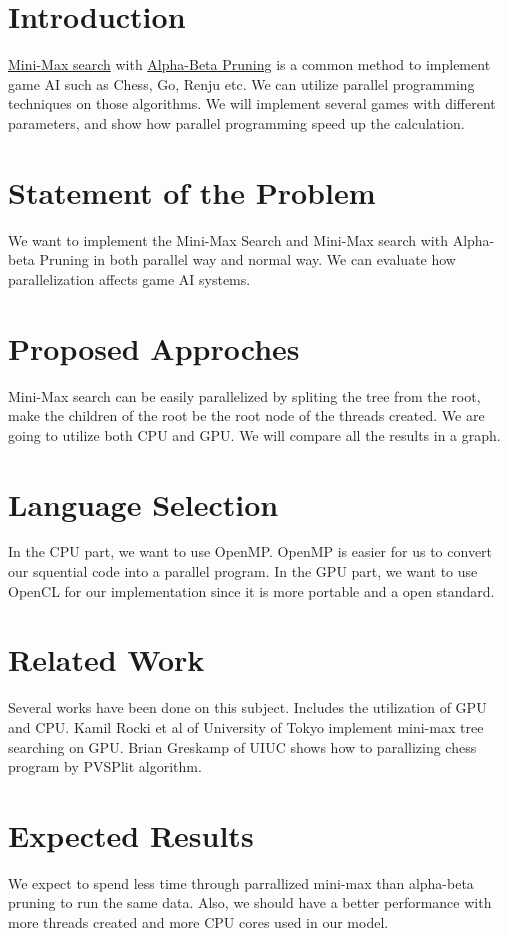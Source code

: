\documentclass{sig-alternate-05-2015}
\begin{document}
\section{Introduction}
\href{https://en.wikipedia.org/wiki/Minimax}{Mini-Max search} with \href{https://en.wikipedia.org/wiki/Minimax}{Alpha-Beta Pruning} is a common method to implement game AI such as Chess, Go, Renju etc. We can utilize parallel programming techniques on those algorithms. We will implement several games with different parameters, and show how parallel programming speed up the calculation.
\section{Statement of the Problem}
We want to implement the Mini-Max Search and Mini-Max search with Alpha-beta Pruning in both parallel way and normal way. We can evaluate how parallelization affects game AI systems.
\section{Proposed Approches}
Mini-Max search can be easily parallelized by spliting the tree from the root, make the children of the root be the root node of the threads created. We are going to utilize both CPU and GPU. We will compare all the results in a graph. 
\section{Language Selection}
In the CPU part, we want to use OpenMP. OpenMP is easier for us to convert our squential code into a parallel program. In the GPU part, we want to use OpenCL for our implementation since it is more portable and a open standard.
\section{Related Work}
Several works have been done on this subject. Includes the utilization of GPU and CPU. Kamil Rocki et al of University of Tokyo implement mini-max tree searching on GPU. Brian Greskamp of UIUC shows how to parallizing chess program by PVSPlit algorithm.   
\section{Expected Results}
We expect to spend less time through parrallized mini-max than alpha-beta pruning to run the same data. Also, we should have a better performance with more threads created and more CPU cores used in our model.
\end{document}
